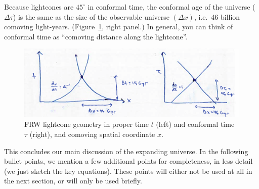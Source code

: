 \documentclass[aps,prd,superscriptaddress,groupedaddress,nofootinbib,nobibnotes]{revtex4}
\begin{document}
\begin{itemize}
 Because lightcones are $45^\circ$ in conformal time, the conformal age of the universe ($\Delta\tau$)
 is the same as the size of the observable universe $(\Delta x)$, i.e.~46 billion comoving light-years.
 (Figure~\ref{fig:frw_lightcone}, right panel.)  In general, you can think of conformal time as ``comoving distance
 along the lightcone''.

\begin{figure}[h!]
\centerline{\includegraphics[width=14cm]{figs/frw_lightcone.png}}
\caption{FRW lightcone geometry in proper time $t$ (left) and conformal time $\tau$ (right),
  and comoving spatial coordinate $x$.}
\label{fig:frw_lightcone}
\end{figure}

\end{itemize}

\par\noindent
This concludes our main discussion of the expanding universe.
In the following bullet points, we mention a few additional points for completeness,
in less detail (we just sketch the key equations).
These points will either not be used at all in the next section, or will only be used
briefly.
\end{document}
